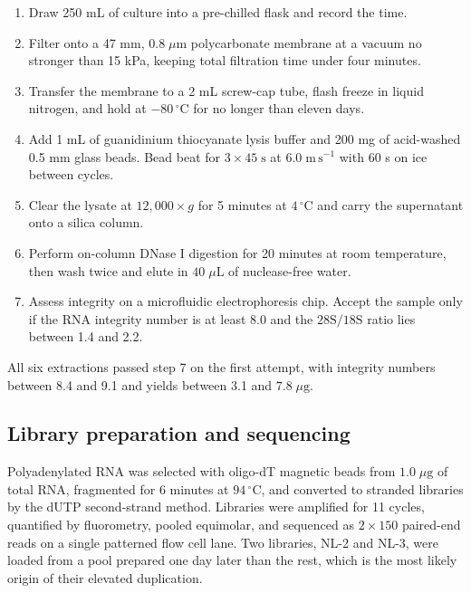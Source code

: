 \begin{enumerate}
  \item Draw 250 mL of culture into a pre-chilled flask and record the time.
  \item Filter onto a 47 mm, $0.8\;\mu\mathrm{m}$ polycarbonate membrane at a
        vacuum no stronger than 15 kPa, keeping total filtration time under
        four minutes.
  \item Transfer the membrane to a 2 mL screw-cap tube, flash freeze in liquid
        nitrogen, and hold at $-80\,^{\circ}\mathrm{C}$ for no longer than
        eleven days.
  \item Add 1 mL of guanidinium thiocyanate lysis buffer and 200 mg of
        acid-washed 0.5 mm glass beads. Bead beat for
        $3 \times 45\;\mathrm{s}$ at $6.0\;\mathrm{m\,s^{-1}}$ with 60 s on ice
        between cycles.
  \item Clear the lysate at $12{,}000 \times g$ for 5 minutes at
        $4\,^{\circ}\mathrm{C}$ and carry the supernatant onto a silica column.
  \item Perform on-column DNase I digestion for 20 minutes at room temperature,
        then wash twice and elute in $40\;\mu\mathrm{L}$ of nuclease-free water.
  \item Assess integrity on a microfluidic electrophoresis chip. Accept the
        sample only if the RNA integrity number is at least 8.0 and the
        $28\mathrm{S}/18\mathrm{S}$ ratio lies between 1.4 and 2.2.
\end{enumerate}

All six extractions passed step 7 on the first attempt, with integrity numbers
between 8.4 and 9.1 and yields between 3.1 and $7.8\;\mu\mathrm{g}$.

\subsection{Library preparation and sequencing}

Polyadenylated RNA was selected with oligo-dT magnetic beads from
$1.0\;\mu\mathrm{g}$ of total RNA, fragmented for 6 minutes at
$94\,^{\circ}\mathrm{C}$, and converted to stranded libraries by the dUTP
second-strand method. Libraries were amplified for 11 cycles, quantified by
fluorometry, pooled equimolar, and sequenced as $2 \times 150$ paired-end reads
on a single patterned flow cell lane. Two libraries, NL-2 and NL-3, were loaded
from a pool prepared one day later than the rest, which is the most likely
origin of their elevated duplication.

